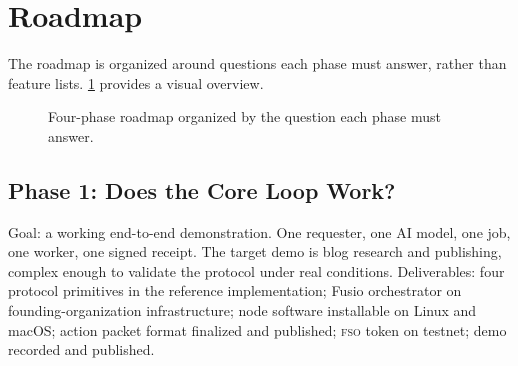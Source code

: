 \documentclass[10pt,twocolumn]{article}
\newcommand{\fso}{\textsc{fso}}
\begin{document}
\section{Roadmap}
\label{sec:roadmap}

The roadmap is organized around questions each phase must answer, rather than feature lists. \cref{fig:roadmap} provides a visual overview.

\begin{figure}[H]
\centering
{}
\caption{Four-phase roadmap organized by the question each phase must answer.}
\label{fig:roadmap}
\end{figure}

\subsection{Phase 1: Does the Core Loop Work?}

Goal: a working end-to-end demonstration. One requester, one AI model, one job, one worker, one signed receipt. The target demo is blog research and publishing, complex enough to validate the protocol under real conditions. Deliverables: four protocol primitives in the reference implementation; Fusio orchestrator on founding-organization infrastructure; node software installable on Linux and macOS; action packet format finalized and published; \fso{} token on testnet; demo recorded and published.
\end{document}
